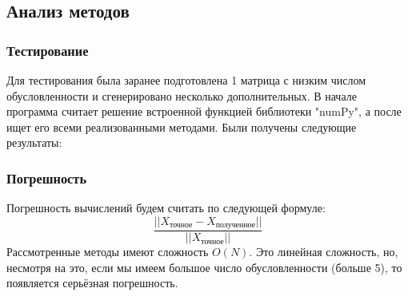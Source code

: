 \subsection{Анализ методов}
\subsubsection{Тестирование}
Для тестирования была заранее подготовлена 1 матрица с низким числом обусловленности и сгенерировано несколько дополнительных.
В начале программа считает решение встроенной функцией библиотеки "numPy", а после ищет его всеми реализованными методами. Были получены следующие результаты:

\subsubsection{Погрешность}
Погрешность вычислений будем считать по следующей формуле:
\[
  \frac{||X_{\text{точное}}-X_{\text{полученное}}||}{||X_{\text{точное}}||}
\]
Рассмотренные методы имеют сложность \(O(N)\). Это линейная сложность, но, несмотря на это, если мы имеем большое число обусловленности (больше 5), то появляется серьёзная погрешность.